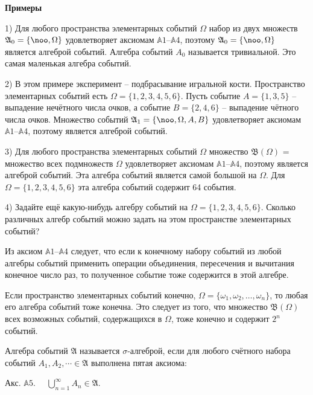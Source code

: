 \textbf{Примеры}

1) Для любого пространства элементарных событий $\Omega$ набор из двух множеств $\mathfrak{A}_0=\{\noo,\Omega\}$ удовлетворяет аксиомам $\mathbb{A}1$--$\mathbb{A}4$, поэтому $\mathfrak{A}_0=\{\noo,\Omega\}$ является алгеброй событий. Алгебра событий $A_0$ называется тривиальной. Это самая маленькая алгебра событий.

2) В этом примере эксперимент -- подбрасывание игральной кости. Пространство элементарных событий есть $\Omega = \{1, 2, 3, 4, 5, 6\}$. Пусть событие
$A = \{1, 3, 5\}$ -- выпадение нечётного числа очков, а событие $B= \{2, 4, 6\}$
-- выпадение чётного числа очков. 
Множество событий $\mathfrak{A}_1 = \{\noo, \Omega, A, B\}$
удовлетворяет аксиомам $\mathbb{A}1$--$\mathbb{A}4$, поэтому является алгеброй событий.

3) Для любого пространства элементарных событий $\Omega$ множество $\mathfrak{B}(\Omega)$ =
множество всех подмножеств $\Omega$ удовлетворяет аксиомам $\mathbb{A}1$--$\mathbb{A}4$, поэтому является алгеброй событий. Эта алгебра событий является самой большой
на $\Omega$. 
Для $\Omega= \{1, 2, 3, 4, 5, 6\}$ эта алгебра событий содержит 64 события.

4) Задайте ещё какую-нибудь алгебру событий на $\Omega = \{1, 2, 3, 4, 5, 6\}$.
Сколько различных алгебр событий можно задать на этом пространстве элементарных событий?

\begin{zam}
Из аксиом $\mathbb{A}1$--$\mathbb{A}4$ следует, что если к конечному набору событий из любой алгебры событий применить операции объединения, пересечения и вычитания конечное число раз, то полученное событие тоже содержится в этой алгебре.
\end{zam}

\begin{zam}
Если пространство элементарных событий конечно,
$\Omega = \{\omega_1,\omega_2,\ldots,\omega_n\}$, то любая его алгебра событий тоже конечна. Это следует из того, что множество $\mathfrak{B}(\Omega)$ всех возможных событий, содержащихся
в $\Omega$, тоже конечно и содержит $2^n$ событий.
\end{zam}

\begin{definition}
 Алгебра событий $\mathfrak{A}$ называется $\sigma$-алгеброй, если для
любого счётного набора событий $A_1,A_2,\cdots \in \mathfrak{A}$ выполнена пятая аксиома:

Акс. $\mathbb{A}5$.$\quad$ $\bigcup\limits_{n=1}^\infty A_n \in\mathfrak{A}$.
\end{definition}


